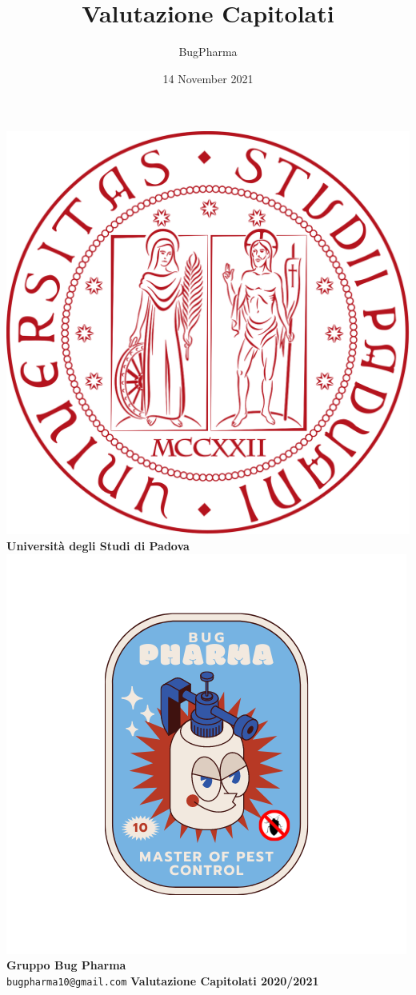 \documentclass[11pt]{article}
\title{Valutazione Capitolati}
\author{BugPharma }
\date{14 November 2021}
\begin{document}
\thispagestyle{empty}
	\begin{titlepage}
		\begin{center}
			\includegraphics[scale = 0.05]{Res/logo_unipd.png}\\
			\bigskip
			\large \textbf{Università degli Studi di Padova} \\
			\vfill
			\includegraphics[scale = 0.7]{Res/BugPharma_Logo.png}\\
			\huge \textbf{Gruppo Bug Pharma} \\
			\vfill
			\large \texttt{bugpharma10@gmail.com}
			\vfill
			\Huge \textbf{Valutazione Capitolati 2020/2021}\\
			

\end{center}
\end{titlepage}
\end{document}
